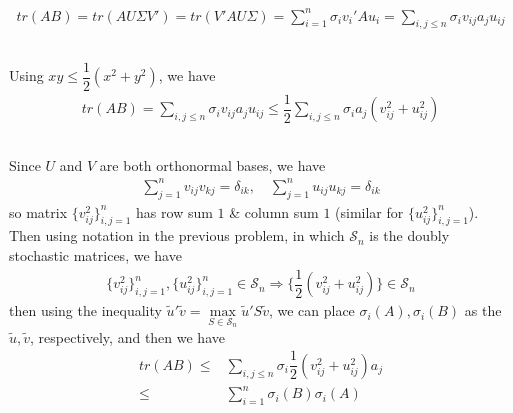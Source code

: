 \documentclass[11pt,a4paper]{ctexart}
\numberwithin{equation}{section}%
\begin{document}
\begin{align*}
    tr(AB)= tr(AU\Sigma V') = tr(V'AU\Sigma ) = \sum_{i=1}^n \sigma _i v_i'Au_i = \sum_{i,j\leq n}\sigma _iv_{ij}a_{j}u_{ij}
\end{align*}
\subsection{}
Using $ xy\leq \dfrac{ 1 }{ 2 }(x^2+y^2)   $, we have
\begin{align*}
    tr(AB) =  \sum_{i,j\leq n}\sigma _iv_{ij}a_{j}u_{ij} \leq \dfrac{ 1 }{ 2 } \sum_{i,j\leq n}\sigma _i a_j(v_{ij}^2+u_{ij}^2)
\end{align*}

\subsection{}
Since $ U $ and $ V $ are both orthonormal bases, we have
\begin{align*}
    \sum_{j=1}^n v_{ij}v_{kj} = \delta _{ik},\quad \sum_{j=1}^n u_{ij}u_{kj} = \delta _{ik}
\end{align*}
so matrix $ \{v_{ij}^2\}_{i,j=1}^n $ has row sum $ 1 $ \& column sum $ 1 $ (similar for $ \{u_{ij}^2\}_{i,j=1}^n $). Then using notation in the previous problem, in which $ \mathcal{S}_n $ is the doubly stochastic matrices, we have
\begin{align*}
    \{v_{ij}^2\}_{i,j=1}^n, \{u_{ij}^2\}_{i,j=1}^n \in \mathcal{S}_n \Rightarrow \{\dfrac{ 1 }{ 2 }(v_{ij}^2+u_{ij}^2)\}\in \mathcal{S}_n
\end{align*}
then using the inequality $     \tilde{u}'\tilde{v} = \mathop{ \max }\limits_{S\in\mathcal{S}_n}\tilde{u}'S\tilde{v}   $, we can place $ \sigma _i(A), \sigma _i(B) $ as the $ \tilde{u},\tilde{v} $, respectively, and then we have
\begin{align*}
    tr(AB) \leq & \sum_{i,j\leq n}\sigma _i  \dfrac{ 1 }{ 2 } (v_{ij}^2+u_{ij}^2) a_j\\
    \leq &\sum_{i=1}^n \sigma _i(B)\sigma _i(A)
\end{align*}
\end{document}

